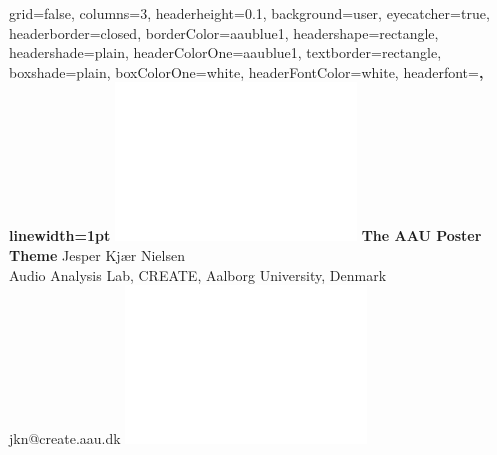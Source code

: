 \documentclass[a0paper,portrait]{baposter}
\begin{document}
\begin{poster}{
  grid=false,
  columns=3,
  headerheight=0.1\textheight,
  background=user,
  eyecatcher=true,
  headerborder=closed,
  borderColor=aaublue1,
  headershape=rectangle,
  headershade=plain,
  headerColorOne=aaublue1,
  textborder=rectangle,
  boxshade=plain,
  boxColorOne=white,
  headerFontColor=white,
  headerfont=\Large\sf\bf,
  linewidth=1pt
}
{
  \includegraphics[height=0.75\headerheight]{AAUgraphics/aau_logo_new_neg}
}
{\color{white}\bf
  The AAU Poster Theme
}
{\color{white}\small
  \vspace{1em} Jesper Kjær Nielsen\\[0.5em]
  Audio Analysis Lab, CREATE, Aalborg University, Denmark\\
  jkn@create.aau.dk
}
{
  \includegraphics[height=0.75\headerheight]{AAUgraphics/aau_logo_new_neg}
}



\end{poster}
\end{document}
